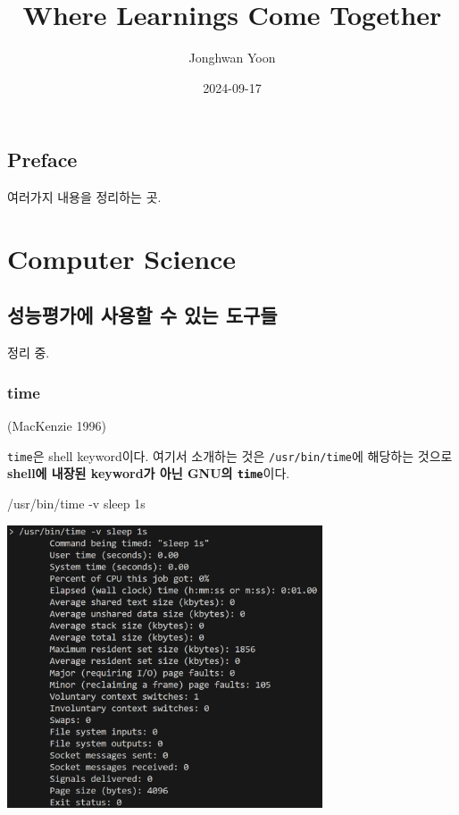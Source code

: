 \documentclass[
  letterpaper,
]{scrbook}
\title{Where Learnings Come Together}
\author{Jonghwan Yoon}
\date{2024-09-17}
\newenvironment{Shaded}{\begin{snugshade}}{\end{snugshade}}
\newcommand{\AttributeTok}[1]{\textcolor[rgb]{0.40,0.45,0.13}{#1}}
\newcommand{\ExtensionTok}[1]{\textcolor[rgb]{0.00,0.23,0.31}{#1}}
\newcommand{\NormalTok}[1]{\textcolor[rgb]{0.00,0.23,0.31}{#1}}
\renewcommand*\contentsname{Table of contents}
\newcommand\contentsname{Table of contents}
\begin{document}
\frontmatter
\maketitle

\renewcommand*\contentsname{Table of contents}
{
\setcounter{tocdepth}{2}
\tableofcontents
}
\mainmatter
{}

\chapter*{Preface}\label{preface}


여러가지 내용을 정리하는 곳.

\part{Computer Science}

\chapter{성능평가에 사용할 수 있는
도구들}\label{uxc131uxb2a5uxd3c9uxac00uxc5d0-uxc0acuxc6a9uxd560-uxc218-uxc788uxb294-uxb3c4uxad6cuxb4e4}

정리 중.

\section*{time}\label{time}


(MacKenzie 1996)

\texttt{time}은 shell keyword이다. 여기서 소개하는 것은
\texttt{/usr/bin/time}에 해당하는 것으로 \textbf{shell에 내장된
keyword가 아닌 GNU의 \texttt{time}}이다.

\begin{Shaded}
\begin{Highlighting}[]
\ExtensionTok{/usr/bin/time} \AttributeTok{{-}v}\NormalTok{ sleep 1s}
\end{Highlighting}
\end{Shaded}

\includegraphics[width=0.7\textwidth,height=\textheight]{chapters/ComputerScience/benchmarking/time_v.png}
\end{document}
